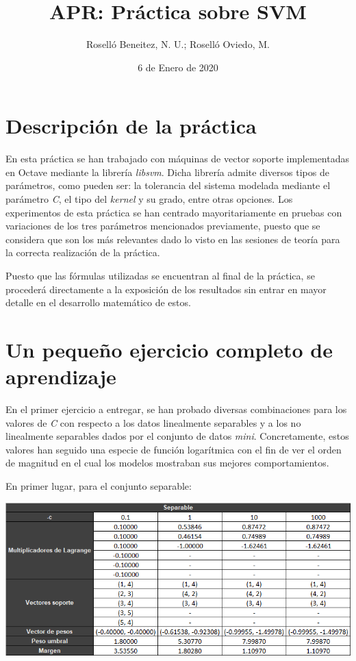\documentclass[a4paper]{article}
\begin{document}
\author{Roselló Beneitez, N. U.; Roselló Oviedo, M.}
\title{APR: Práctica sobre SVM}
\date{6 de Enero de 2020}
\maketitle{}
\thispagestyle{empty}

\newpage
\tableofcontents
\listoffigures

\newpage
\section{Descripción de la práctica}
\quad En esta práctica se han trabajado con máquinas de vector soporte implementadas en Octave mediante la librería \textit{libsvm}. Dicha librería admite diversos  tipos de parámetros, como pueden ser: la tolerancia del sistema modelada mediante el parámetro \textit{C}, el tipo del \textit{kernel} y su grado, entre otras opciones. Los experimentos de esta práctica se han centrado mayoritariamente en pruebas con variaciones de los tres parámetros mencionados previamente, puesto que se considera que son los más relevantes dado lo visto en las sesiones de teoría para la correcta realización de la práctica.

\quad Puesto que las fórmulas utilizadas se encuentran al final de la práctica, se procederá directamente a la exposición de los resultados sin entrar en mayor detalle en el desarrollo matemático de estos.

\section{Un pequeño ejercicio completo de aprendizaje}
\quad En el primer ejercicio a entregar, se han probado diversas combinaciones para los valores de \textit{C} con respecto a los datos linealmente separables y a los no linealmente separables dados por el conjunto de datos \textit{mini}. Concretamente, estos valores han seguido una especie de función logarítmica con el fin de ver el orden de magnitud en el cual los modelos mostraban sus mejores comportamientos.

En primer lugar, para el conjunto separable:

\includegraphics[width=\textwidth]{2_Separables}
\end{document}
